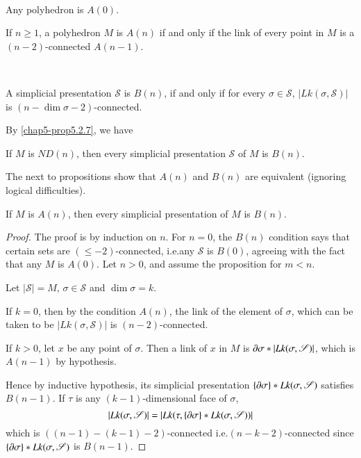 \begin{definition}\label{chap5-defi5.3.1}
~

Any polyhedron is $A(0)$.

If $n\geq 1$, a polyhedron $M$ is $A(n)$ if and only if the link of every point in $M$ is a $(n-2)$-connected $A(n-1)$.
\end{definition}

\begin{definition}\label{chap5-defi5.3.2}
~

A simplicial presentation $\mathscr{S}$ is $B(n)$, if and only if for every $\sigma\in \mathscr{S}$, $|Lk(\sigma,\mathscr{S})|$ is $(n-\dim\sigma-2)$-connected.

\end{definition}

By \ref{chap5-prop5.2.7}, we have

\begin{proposition}\label{chap5-prop5.3.3}
If $M$ is $ND(n)$, then every simplicial presentation $\mathscr{S}$ of $M$ is $B(n)$.
\end{proposition}

The next to propositions show that $A(n)$ and $B(n)$ are equivalent (ignoring logical difficulties).

\begin{proposition}\label{chap5-prop5.3.4}
If $M$ is $A(n)$, then every simplicial presentation of $M$ is $B(n)$. 
\end{proposition}

\begin{proof}
The proof is by induction on $n$. For $n=0$, the $B(n)$ condition says that certain sets are $(\leq -2)$-connected, i.e.\@ any $\mathscr{S}$ is $B(0)$, agreeing with the fact that any $M$ is $A(0)$. Let $n>0$, and assume the proposition for $m<n$.

Let $|\mathscr{S}|=M$, $\sigma\in \mathscr{S}$ and $\dim \sigma=k$.

If $k=0$, then by the condition $A(n)$, the link of the element of $\sigma$, which can be taken to be $|Lk(\sigma,\mathscr{S})|$ is $(n-2)$-connected.\pageoriginale 

If $k>0$, let $x$ be any point of $\sigma$. Then a link of $x$ in $M$ is $\partial \sigma\ast|Lk(\sigma,\mathscr{S})|$, which is $A(n-1)$ by hypothesis.

Hence by inductive hypothesis, its simplicial presentation $\{\partial \sigma\}\ast Lk(\sigma,\mathscr{S})$ satisfies $B(n-1)$. If $\tau$ is any $(k-1)$-dimensional face of $\sigma$,
$$
|Lk(\sigma,\mathscr{S})|=|Lk(\tau,\{\partial \sigma\}\ast Lk(\sigma,\mathscr{S}))|
$$
which is $((n-1)-(k-1)-2)$-connected i.e.\@ $(n-k-2)$-connected since $\{\partial \sigma\}\ast Lk(\sigma,\mathscr{S})$ is $B(n-1)$.
\end{proof}

